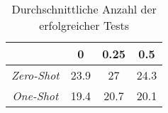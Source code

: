 \bgroup
\def\arraystretch{2}
\begin{table}[H]
	\vspace{.5cm}
	\centering		
	\begin{center}
		\begin{tabular}{|c||c|c|c|}
			\hline 
			& 0 & 0.25 & 0.5 \\
			\hline 
			\hline
			\textit{Zero-Shot} & 23.9 & 27 & 24.3 \\
			\hline
			\textit{One-Shot} & 19.4 & 20.7 & 20.1 \\
			\hline
		\end{tabular} 
	\end{center}
	\caption{Durchschnittliche Anzahl der erfolgreicher Tests}
	\label{fig:succ-unit}
	\vspace{-.8cm}
\end{table}
\egroup